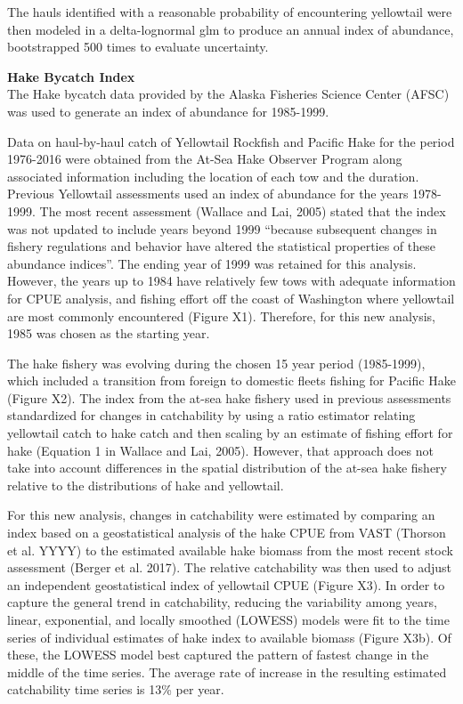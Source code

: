 \documentclass[12pt,]{article}
\begin{document}
The hauls identified with a reasonable probability of encountering
yellowtail were then modeled in a delta-lognormal glm to produce an
annual index of abundance, bootstrapped 500 times to evaluate
uncertainty.

\textbf{Hake Bycatch Index}\\
The Hake bycatch data provided by the Alaska Fisheries Science Center
(AFSC) was used to generate an index of abundance for 1985-1999.

Data on haul-by-haul catch of Yellowtail Rockfish and Pacific Hake for
the period 1976-2016 were obtained from the At-Sea Hake Observer Program
along associated information including the location of each tow and the
duration. Previous Yellowtail assessments used an index of abundance for
the years 1978-1999. The most recent assessment (Wallace and Lai, 2005)
stated that the index was not updated to include years beyond 1999
``because subsequent changes in fishery regulations and behavior have
altered the statistical properties of these abundance indices''. The
ending year of 1999 was retained for this analysis. However, the years
up to 1984 have relatively few tows with adequate information for CPUE
analysis, and fishing effort off the coast of Washington where
yellowtail are most commonly encountered (Figure X1). Therefore, for
this new analysis, 1985 was chosen as the starting year.

The hake fishery was evolving during the chosen 15 year period
(1985-1999), which included a transition from foreign to domestic fleets
fishing for Pacific Hake (Figure X2). The index from the at-sea hake
fishery used in previous assessments standardized for changes in
catchability by using a ratio estimator relating yellowtail catch to
hake catch and then scaling by an estimate of fishing effort for hake
(Equation 1 in Wallace and Lai, 2005). However, that approach does not
take into account differences in the spatial distribution of the at-sea
hake fishery relative to the distributions of hake and yellowtail.

For this new analysis, changes in catchability were estimated by
comparing an index based on a geostatistical analysis of the hake CPUE
from VAST (Thorson et al. YYYY) to the estimated available hake biomass
from the most recent stock assessment (Berger et al. 2017). The relative
catchability was then used to adjust an independent geostatistical index
of yellowtail CPUE (Figure X3). In order to capture the general trend in
catchability, reducing the variability among years, linear, exponential,
and locally smoothed (LOWESS) models were fit to the time series of
individual estimates of hake index to available biomass (Figure X3b). Of
these, the LOWESS model best captured the pattern of fastest change in
the middle of the time series. The average rate of increase in the
resulting estimated catchability time series is 13\% per year.
\end{document}
